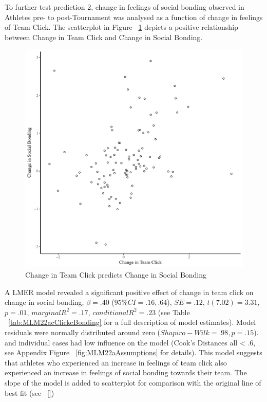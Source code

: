 \begin{CJK}{UTF8}{gbsn}
To further test prediction 2, change in feelings of social bonding observed in Athletes pre- to post-Tournament was analysed as a function of change in feelings of Team Click. The scatterplot in Figure ~\ref{fig:clickBondDeltaBasicXY} depicts a positive relationship between Change in Team Click and Change in Social Bonding.

    \begin{figure}[htbp]
      \centering
    \includegraphics[scale=.5]{images/clickBondDeltaBasicXY.pdf}
      \caption{Change in Team Click predicts Change in Social Bonding}
      \label{fig:clickBondDeltaBasicXY}
    \end{figure}

A LMER model revealed a significant positive effect of change in team click on change in social bonding, $\beta = .40$ ($95\% CI =  .16, .64$), $SE = .12$, $t(7.02) = 3.31$, $p = .01$, $marginal R^2 = .17$, $conditional R^2 = .23$ (see Table ~\ref{tab:MLM22acClickcBonding} for a full description of model estimates).  Model residuals were normally distributed around zero ($Shapiro-Wilk = .98, p = .15$). and individual cases had low influence on the model (Cook's Distances all < .6, see Appendix Figure ~\ref{fig:MLM22aAssumptions} for details). This model suggests that athletes who experienced an increase in feelings of team click also experienced an increase in feelings of social bonding towards their team.  The slope of the model is added to scatterplot for comparison with the original line of best fit (see ~\ref{})


\end{CJK}
